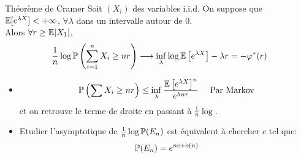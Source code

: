 \documentclass[]{report}
\begin{document}
    \begin{tm}{Théorème de Cramer}{}
        Soit $(X_i)$ des variables i.i.d. On suppose que $\mathbb{E}[e^{\lambda X}]<+\infty$, $\forall \lambda$ dans un intervalle autour de $0$.\\
        Alors $\forall r\ge \mathbb{E}[X_1]$,
        \[\frac{1}{n}\log \mathbb{P}\left(\sum_{i=1}^n X_i \ge nr\right)\longrightarrow \inf_\lambda \log \mathbb{E}\left[e^{\lambda X}\right]-\lambda r=-\varphi^*(r)\]
    \end{tm}

    \begin{re}{}{}
        \begin{itemize}
            \item \[\mathbb{P}\left(\sum X_i \ge nr\right)\le \inf_\lambda \frac{\mathbb{E}\left[ e^{\lambda X}\right]^n}{e^{\lambda nr}}\quad \text{ Par Markov}\]
                et on retrouve le terme de droite en passant à $\frac{1}{n}\log$.
            \item Etudier l'asymptotique de $\frac{1}{n}\log \mathbb{P}(E_n)$ est équivalent à chercher $c$ tel que:
                \[\mathbb{P}(E_n)=e^{nc+o(n)}\]
        \end{itemize}
    \end{re}
\end{document}
